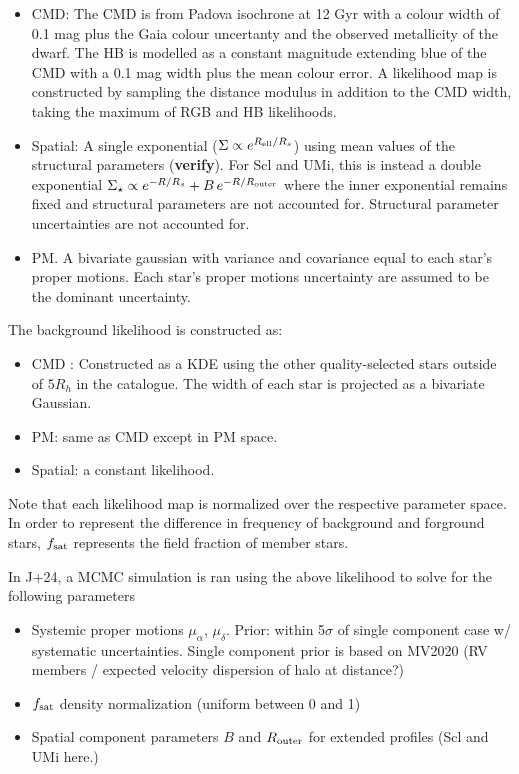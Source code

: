 \begin{itemize}
\tightlist
\item
  CMD: The CMD is from Padova \citep{girardi+2002} isochrone at 12 Gyr
  with a colour width of 0.1 mag plus the Gaia colour uncertanty and the
  observed metallicity of the dwarf. The HB is modelled as a constant
  magnitude extending blue of the CMD with a 0.1 mag width plus the mean
  colour error. A likelihood map is constructed by sampling the distance
  modulus in addition to the CMD width, taking the maximum of RGB and HB
  likelihoods.
\item
  Spatial: A single exponential
  (\(\Sigma \propto e^{R_{\rm ell} / R_s}\)) using mean values of the
  structural parameters (\textbf{verify}). For Scl and UMi, this is
  instead a double exponential
  \(\Sigma_\star \propto e^{-R/R_s} + B\,e^{-R/R_{\rm outer}}\) where
  the inner exponential remains fixed and structural parameters are not
  accounted for. Structural parameter uncertainties are not accounted
  for.
\item
  PM. A bivariate gaussian with variance and covariance equal to each
  star's proper motions. Each star's proper motions uncertainty are
  assumed to be the dominant uncertainty.
\end{itemize}

The background likelihood is constructed as:

\begin{itemize}
\tightlist
\item
  CMD : Constructed as a KDE using the other quality-selected stars
  outside of \(5R_h\) in the catalogue. The width of each star is
  projected as a bivariate Gaussian.
\item
  PM: same as CMD except in PM space.
\item
  Spatial: a constant likelihood.
\end{itemize}

Note that each likelihood map is normalized over the respective
parameter space. In order to represent the difference in frequency of
background and forground stars, \(f_{\rm sat}\) represents the field
fraction of member stars.

In J+24, a MCMC simulation is ran using the above likelihood to solve
for the following parameters

\begin{itemize}
\tightlist
\item
  Systemic proper motions \(\mu_\alpha\), \(\mu_\delta\). Prior: within
  5\(\sigma\) of single component case w/ systematic uncertainties.
  Single component prior is based on MV2020 (RV members / expected
  velocity dispersion of halo at distance?)
\item
  \(f_{\rm sat}\) density normalization (uniform between 0 and 1)
\item
  Spatial component parameters \(B\) and \(R_{\rm outer}\) for extended
  profiles (Scl and UMi here.)
\end{itemize}

